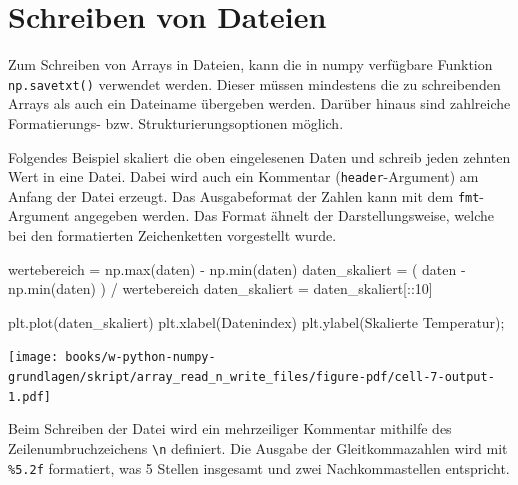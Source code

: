 \documentclass[
  letterpaper,
  DIV=11,
  numbers=noendperiod]{scrreprt}
\newenvironment{Shaded}{\begin{snugshade}}{\end{snugshade}}
\newcommand{\BuiltInTok}[1]{\textcolor[rgb]{0.00,0.23,0.31}{#1}}
\newcommand{\DecValTok}[1]{\textcolor[rgb]{0.68,0.00,0.00}{#1}}
\newcommand{\NormalTok}[1]{\textcolor[rgb]{0.00,0.23,0.31}{#1}}
\newcommand{\OperatorTok}[1]{\textcolor[rgb]{0.37,0.37,0.37}{#1}}
\newcommand{\StringTok}[1]{\textcolor[rgb]{0.13,0.47,0.30}{#1}}
\begin{document}
\section{Schreiben von Dateien}\label{schreiben-von-dateien}

Zum Schreiben von Arrays in Dateien, kann die in numpy verfügbare
Funktion \texttt{np.savetxt()} verwendet werden. Dieser müssen
mindestens die zu schreibenden Arrays als auch ein Dateiname übergeben
werden. Darüber hinaus sind zahlreiche Formatierungs- bzw.
Strukturierungsoptionen möglich.

Folgendes Beispiel skaliert die oben eingelesenen Daten und schreib
jeden zehnten Wert in eine Datei. Dabei wird auch ein Kommentar
(\texttt{header}-Argument) am Anfang der Datei erzeugt. Das
Ausgabeformat der Zahlen kann mit dem \texttt{fmt}-Argument angegeben
werden. Das Format ähnelt der Darstellungsweise, welche bei den
formatierten Zeichenketten vorgestellt wurde.

\begin{Shaded}
\begin{Highlighting}[]
\NormalTok{wertebereich }\OperatorTok{=}\NormalTok{ np.}\BuiltInTok{max}\NormalTok{(daten) }\OperatorTok{{-}}\NormalTok{ np.}\BuiltInTok{min}\NormalTok{(daten)}
\NormalTok{daten\_skaliert }\OperatorTok{=}\NormalTok{ ( daten }\OperatorTok{{-}}\NormalTok{ np.}\BuiltInTok{min}\NormalTok{(daten) ) }\OperatorTok{/}\NormalTok{ wertebereich}
\NormalTok{daten\_skaliert }\OperatorTok{=}\NormalTok{ daten\_skaliert[::}\DecValTok{10}\NormalTok{]}
\end{Highlighting}
\end{Shaded}

\begin{Shaded}
\begin{Highlighting}[]
\NormalTok{plt.plot(daten\_skaliert)}
\NormalTok{plt.xlabel(}\StringTok{\textquotesingle{}Datenindex\textquotesingle{}}\NormalTok{)}
\NormalTok{plt.ylabel(}\StringTok{\textquotesingle{}Skalierte Temperatur\textquotesingle{}}\NormalTok{)}\OperatorTok{;}
\end{Highlighting}
\end{Shaded}

\texttt{[image: books/w-python-numpy-grundlagen/skript/array\_read\_n\_write\_files/figure-pdf/cell-7-output-1.pdf]}

Beim Schreiben der Datei wird ein mehrzeiliger Kommentar mithilfe des
Zeilenumbruchzeichens \texttt{\textbackslash{}n} definiert. Die Ausgabe
der Gleitkommazahlen wird mit \texttt{\%5.2f} formatiert, was 5 Stellen
insgesamt und zwei Nachkommastellen entspricht.
\end{document}

